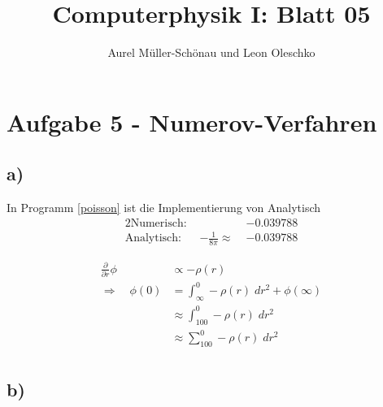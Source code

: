 


\setcounter{secnumdepth}{0}



\title{Computerphysik I: Blatt 05}
\author{Aurel Müller-Schönau und Leon Oleschko}
\maketitle

\section{Aufgabe 5 - Numerov-Verfahren}
\subsection{a)}
In Programm \ref{poisson} ist die Implementierung von 
Analytisch
\begin{alignat}{2}
	\text{Numerisch: }&& -0.039788\\
	\text{Analytisch: }&-\frac{1}{8\pi} \approx\;& -0.039788
\end{alignat}

\begin{align}
	\frac{\partial}{\partial r} \phi &\propto - \rho(r)\\ 
	\Rightarrow\quad \phi(0) &= \int_{\infty}^0 - \rho(r)\;dr^2 + \phi(\infty)\\
	&\approx \int_{100}^0 - \rho(r)\;dr^2\\
	&\approx \sum_{100}^0 - \rho(r)\;dr^2\\
\end{align}

\subsection{b)}


